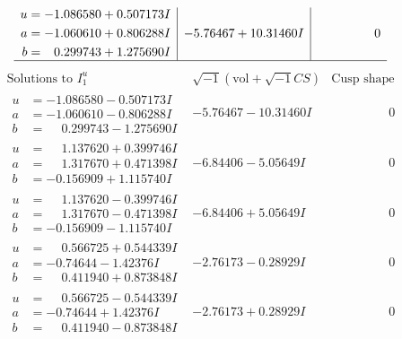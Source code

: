 \documentclass[1p]{elsarticle_modified}
\theoremstyle{definition}
\newcommand{\I}{\sqrt{-1}}
\begin{document}
$$\begin{array}{c|c|c}
\begin{aligned}
u &= -1.086580 + 0.507173 I \\
a &= -1.060610 + 0.806288 I \\
b &= \phantom{-}0.299743 + 1.275690 I\end{aligned}
 & -5.76467 + 10.31460 I & \phantom{-0.000000 } 0\\
 \hline 
 \end{array}$$\newpage$$\begin{array}{c|c|c}  
\text{Solutions to }I^u_{1}& \I (\text{vol} + \sqrt{-1}CS) & \text{Cusp shape}\\
 \hline 
\begin{aligned}
u &= -1.086580 - 0.507173 I \\
a &= -1.060610 - 0.806288 I \\
b &= \phantom{-}0.299743 - 1.275690 I\end{aligned}
 & -5.76467 - 10.31460 I & \phantom{-0.000000 } 0 \\ \hline\begin{aligned}
u &= \phantom{-}1.137620 + 0.399746 I \\
a &= \phantom{-}1.317670 + 0.471398 I \\
b &= -0.156909 + 1.115740 I\end{aligned}
 & -6.84406 - 5.05649 I & \phantom{-0.000000 } 0 \\ \hline\begin{aligned}
u &= \phantom{-}1.137620 - 0.399746 I \\
a &= \phantom{-}1.317670 - 0.471398 I \\
b &= -0.156909 - 1.115740 I\end{aligned}
 & -6.84406 + 5.05649 I & \phantom{-0.000000 } 0 \\ \hline\begin{aligned}
u &= \phantom{-}0.566725 + 0.544339 I \\
a &= -0.74644 - 1.42376 I \\
b &= \phantom{-}0.411940 + 0.873848 I\end{aligned}
 & -2.76173 - 0.28929 I & \phantom{-0.000000 } 0 \\ \hline\begin{aligned}
u &= \phantom{-}0.566725 - 0.544339 I \\
a &= -0.74644 + 1.42376 I \\
b &= \phantom{-}0.411940 - 0.873848 I\end{aligned}
 & -2.76173 + 0.28929 I & \phantom{-0.000000 } 0 \\ \hline\begin{aligned}

\end{aligned}
\end{array}$$
\end{document}
